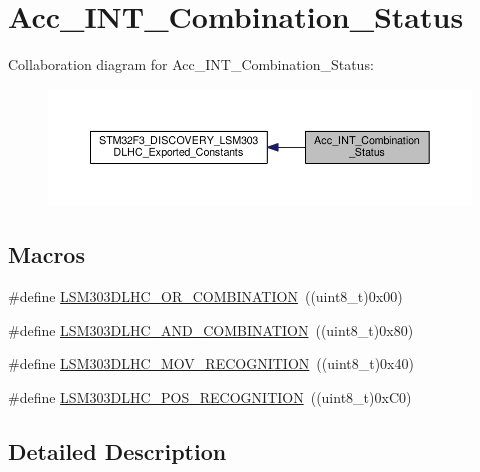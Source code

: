 \hypertarget{group__Acc__INT__Combination__Status}{\section{Acc\+\_\+\+I\+N\+T\+\_\+\+Combination\+\_\+\+Status}
\label{group__Acc__INT__Combination__Status}
}
Collaboration diagram for Acc\+\_\+\+I\+N\+T\+\_\+\+Combination\+\_\+\+Status\+:\nopagebreak
\begin{figure}[H]
\begin{center}
\leavevmode
\includegraphics[width=350pt]{group__Acc__INT__Combination__Status}
\end{center}
\end{figure}
\subsection*{Macros}
\begin{DoxyCompactItemize}
\item 
\#define \hyperlink{group__Acc__INT__Combination__Status_ga5665bd354dd1fd9606e93f3f02d5526e}{L\+S\+M303\+D\+L\+H\+C\+\_\+\+O\+R\+\_\+\+C\+O\+M\+B\+I\+N\+A\+T\+I\+O\+N}~((uint8\+\_\+t)0x00)
\item 
\#define \hyperlink{group__Acc__INT__Combination__Status_gaa57f58878b230f281cdf31d76f99ef22}{L\+S\+M303\+D\+L\+H\+C\+\_\+\+A\+N\+D\+\_\+\+C\+O\+M\+B\+I\+N\+A\+T\+I\+O\+N}~((uint8\+\_\+t)0x80)
\item 
\#define \hyperlink{group__Acc__INT__Combination__Status_ga40a387f95e7169ca1f7aac9b9cef5f34}{L\+S\+M303\+D\+L\+H\+C\+\_\+\+M\+O\+V\+\_\+\+R\+E\+C\+O\+G\+N\+I\+T\+I\+O\+N}~((uint8\+\_\+t)0x40)
\item 
\#define \hyperlink{group__Acc__INT__Combination__Status_gaaa50f702e13016f9167a5932a4a748f5}{L\+S\+M303\+D\+L\+H\+C\+\_\+\+P\+O\+S\+\_\+\+R\+E\+C\+O\+G\+N\+I\+T\+I\+O\+N}~((uint8\+\_\+t)0x\+C0)
\end{DoxyCompactItemize}


\subsection{Detailed Description}


